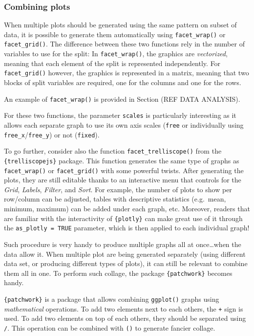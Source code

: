 \documentclass[
]{krantz}
\begin{document}
\hypertarget{combining-plots}{%
\subsubsection{Combining plots}\label{combining-plots}}

When multiple plots should be generated using the same pattern on subset of data, it is possible to generate them automatically using \texttt{facet\_wrap()} or \texttt{facet\_grid()}. The difference between these two functions rely in the number of variables to use for the split: In \texttt{facet\_wrap()}, the graphics are \emph{vectorized}, meaning that each element of the split is represented independently. For \texttt{facet\_grid()} however, the graphics is represented in a matrix, meaning that two blocks of split variables are required, one for the columns and one for the rows.

An example of \texttt{facet\_wrap()} is provided in Section (REF DATA ANALYSIS).

For these two functions, the parameter \texttt{scales} is particularly interesting as it allows each separate graph to use its own axis scales (\texttt{free} or individually using \texttt{free\_x}/\texttt{free\_y}) or not (\texttt{fixed}).

To go further, consider also the function \texttt{facet\_trelliscope()} from the \texttt{\{trelliscopejs\}} package. This function generates the same type of graphs as \texttt{facet\_wrap()} or \texttt{facet\_grid()} with some powerful twists. After generating the plots, they are still editable thanks to an interactive menu that controls for the \emph{Grid}, \emph{Labels}, \emph{Filter}, and \emph{Sort}. For example, the number of plots to show per row/column can be adjusted, tables with descriptive statistics (e.g.~mean, minimum, maximum) can be added under each graph, etc. Moreover, readers that are familiar with the interactivity of \texttt{\{plotly\}} can make great use of it through the \texttt{as\_plotly\ =\ TRUE} parameter, which is then applied to each individual graph!

Such procedure is very handy to produce multiple graphs all at once\ldots when the data allow it.
When multiple plot are being generated separately (using different data set, or producing different types of plots), it can still be relevant to combine them all in one. To perform such collage, the package \texttt{\{patchwork\}} becomes handy.

\texttt{\{patchwork\}} is a package that allows combining \texttt{ggplot()} graphs using \emph{mathematical} operations. To add two elements next to each others, the \texttt{+} sign is used. To add two elements on top of each others, they should be separated using \texttt{/}. This operation can be combined with \texttt{()} to generate fancier collage.
\end{document}

